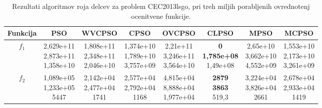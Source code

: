 \begin{table}[t]
    \renewcommand{\arraystretch}{1.1}
    \centering
    \caption{Rezultati algoritmov roja delcev za problem CEC2013lsgo, pri treh miljih porabljenih ovrednotenj ocenitvene funkcije.} \label{tab:bech:opt_three_stats}
    \begin{small}
    \begin{tabular}{|c|c|c|c|c|c|c|c|}
        \hline
        Funkcija & PSO & WVCPSO & CPSO & OVCPSO & CLPSO & MPSO & MCPSO \\\hline
        $f_1$    & \makecell{2,629e+11 \\ 2,873e+11 \\ 1,358e+10} & \makecell{1,808e+11 \\ 2,348e+11 \\ 2,046e+10} & \makecell{1,374e+10 \\ 1,789e+10 \\ 3,757e+09} & \makecell{2,21e+11 \\ 3,246e+11 \\ 3,564e+10} & \makecell{\textbf{0} \\ \textbf{1,785e+08} \\ 1,49e+08}          & \makecell{2,65e+10 \\ 3,662e+10 \\ 4,552e+09}  & \makecell{1,553e+10 \\ 2,173e+10 \\ 3,261e+09} \\\hline
        $f_2$    & \makecell{1,089e+05 \\ 1,233e+05 \\ 5447}      & \makecell{2,142e+04 \\ 2,477e+04 \\ 1741}      & \makecell{2,577e+04 \\ 2,792e+04 \\ 1168}      & \makecell{4,815e+04 \\ 8,888e+04 \\ 1,977e+04} & \makecell{\textbf{2879} \\ \textbf{3863} \\ 519,3}               & \makecell{3,224e+04 \\ 3,826e+04 \\ 2661}      & \makecell{2,678e+04 \\ 2,933e+04 \\ 1419}      \\\hline

\end{tabular}
\end{small}
\end{table}
